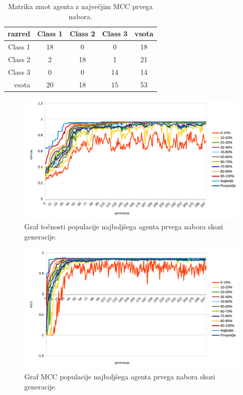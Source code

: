 \begin{table}[H]
    \centering
    \begin{tabular}{||rcccc||}
        \hline
        razred  & Class 1 & Class 2 & Class 3 & vsota \\ \hline
        Class 1 & 18      & 0       & 0       & 18    \\ \hline
        Class 2 & 2       & 18      & 1       & 21    \\ \hline
        Class 3 & 0       & 0       & 14      & 14    \\ \hline
        vsota   & 20      & 18      & 15      & 53    \\ \hline
    \end{tabular}
    \caption{Matrika zmot agenta z največjim MCC prvega nabora.}
    \label{tab:wine_mcc_1}
\end{table}

\begin{figure}[H]
    \begin{center}
        \includegraphics[width=13cm]{wine/1/acc}
    \end{center}
    \caption{Graf točnosti populacije najboljšega agenta prvega nabora skozi generacije.}
    \label{fig:wine_acc_1}
\end{figure}

\begin{figure}[H]
    \begin{center}
        \includegraphics[width=13cm]{wine/1/mcc}
    \end{center}
    \caption{Graf MCC populacije najboljšega agenta prvega nabora skozi generacije.}
    \label{fig:wine_mcc_1}
\end{figure}

